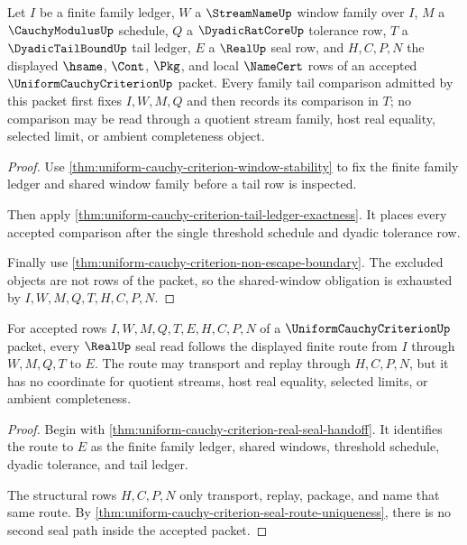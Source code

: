 \begin{theorem}
\label{thm:uniform-cauchy-criterion-shared-window-obligation}
Let $I$ be a finite family ledger, $W$ a $\StreamNameUp$ window family over $I$, $M$ a $\CauchyModulusUp$ schedule, $Q$ a $\DyadicRatCoreUp$ tolerance row, $T$ a $\DyadicTailBoundUp$ tail ledger, $E$ a $\RealUp$ seal row, and $H,C,P,N$ the displayed $\hsame$, $\Cont$, $\Pkg$, and local $\NameCert$ rows of an accepted $\UniformCauchyCriterionUp$ packet. Every family tail comparison admitted by this packet first fixes $I,W,M,Q$ and then records its comparison in $T$; no comparison may be read through a quotient stream family, host real equality, selected limit, or ambient completeness object.
\end{theorem}
\begin{proof}
Use \autoref{thm:uniform-cauchy-criterion-window-stability} to fix the finite family ledger and shared window family before a tail row is inspected.

Then apply \autoref{thm:uniform-cauchy-criterion-tail-ledger-exactness}. It places every accepted comparison after the single threshold schedule and dyadic tolerance row.

Finally use \autoref{thm:uniform-cauchy-criterion-non-escape-boundary}. The excluded objects are not rows of the packet, so the shared-window obligation is exhausted by $I,W,M,Q,T,H,C,P,N$.
\end{proof}

\begin{theorem}
\label{thm:uniform-cauchy-criterion-seal-route-obligation}
For accepted rows $I,W,M,Q,T,E,H,C,P,N$ of a $\UniformCauchyCriterionUp$ packet, every $\RealUp$ seal read follows the displayed finite route from $I$ through $W,M,Q,T$ to $E$. The route may transport and replay through $H,C,P,N$, but it has no coordinate for quotient streams, host real equality, selected limits, or ambient completeness.
\end{theorem}
\begin{proof}
Begin with \autoref{thm:uniform-cauchy-criterion-real-seal-handoff}. It identifies the route to $E$ as the finite family ledger, shared windows, threshold schedule, dyadic tolerance, and tail ledger.

The structural rows $H,C,P,N$ only transport, replay, package, and name that same route. By \autoref{thm:uniform-cauchy-criterion-seal-route-uniqueness}, there is no second seal path inside the accepted packet.
\end{proof}

